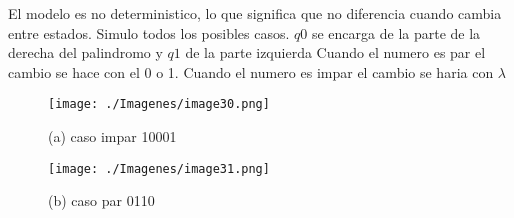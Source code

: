 \documentclass{article}
\begin{document}
         El modelo es no deterministico, lo que significa que no diferencia cuando cambia entre estados. 
         Simulo todos los posibles casos.
         $q0$ se encarga de la parte de la derecha del palindromo y $q1$ de la parte izquierda 
         Cuando el numero es par el cambio se hace con el 0 o 1. Cuando el numero es impar el cambio se haria con $\lambda$ 
         
        \begin{figure}[!h]
            \centering
            \texttt{[image: ./Imagenes/image30.png]}  
            \label{fig:label4}
            \caption*{(a) caso impar 10001}
        \end{figure}

        \begin{figure}[!h]
            \centering
            \texttt{[image: ./Imagenes/image31.png]}
            \label{fig:label4}
            \caption*{(b) caso par 0110}
        \end{figure}
    
\end{document}
